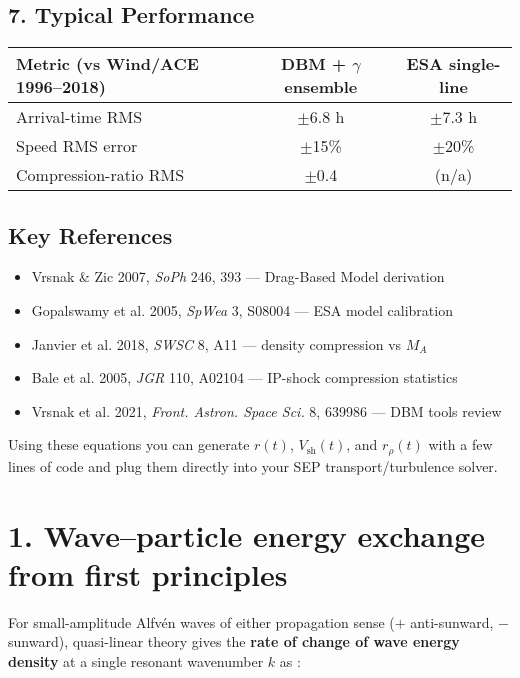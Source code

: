 \subsection*{7. Typical Performance}
\begin{center}
\begin{tabular}{|l|c|c|}
\hline
Metric (vs Wind/ACE 1996--2018) & DBM + $\gamma$ ensemble & ESA single-line \\
\hline
Arrival-time RMS & $\pm$6.8 h & $\pm$7.3 h \\
Speed RMS error  & $\pm$15\% & $\pm$20\% \\
Compression-ratio RMS & $\pm$0.4 & (n/a) \\
\hline
\end{tabular}
\end{center}

\subsection*{Key References}
\begin{itemize}
  \item Vrsnak \& Zic 2007, \emph{SoPh} 246, 393 --- Drag-Based Model derivation
  \item Gopalswamy et al. 2005, \emph{SpWea} 3, S08004 --- ESA model calibration
  \item Janvier et al. 2018, \emph{SWSC} 8, A11 --- density compression vs $M_A$
  \item Bale et al. 2005, \emph{JGR} 110, A02104 --- IP-shock compression statistics
  \item Vrsnak et al. 2021, \emph{Front. Astron. Space Sci.} 8, 639986 --- DBM tools review
\end{itemize}

Using these equations you can generate $r(t)$, $V_{\text{sh}}(t)$, and $r_{\rho}(t)$ with a few lines of code and plug them directly into your SEP transport/turbulence solver.

\section*{1. Wave--particle energy exchange from first principles}

For small-amplitude Alfvén waves of either propagation sense ($+$ anti-sunward, $-$ sunward), quasi-linear theory gives the \textbf{rate of change of wave energy density} at a single resonant wavenumber $k$ as \cite{Jokipii1966,Skilling1975,Schlickeiser1989}:

